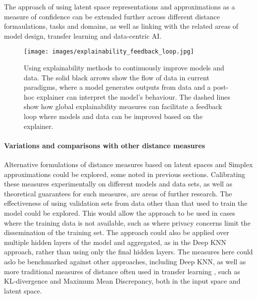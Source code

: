 \documentclass{article}
\begin{document}
The approach of using latent space representations and approximations as a measure of confidence can be extended further across different distance formaulations, tasks and domains, as well as linking with the related areas of model design, transfer learning and data-centric AI.

\begin{figure}[ht]
  \centering
  \texttt{[image: images/explainability\_feedback\_loop.jpg]}
  \caption{Using explainability methods to continuously improve models and data. The solid black arrows show the flow of data in current paradigms, where a model generates outputs from data and a post-hoc explainer can interpret the model's behaviour. The dashed lines show how global explainability measures can facilitate a feedback loop where models and data can be improved based on the explainer.}
  \label{explainability_loop}
\end{figure}


\paragraph{Variations and comparisons with other distance measures}
Alternative formulations of distance measures based on latent spaces and Simplex approximations could be explored, some noted in previous sections.
Calibrating these measures experimentally on different models and data sets, as well as theoretical guarantees for such measures, are areas of further research.
The effectiveness of using validation sets from data other than that used to train the model could be explored. This would allow the approach to be used in cases where the training data is not available, such as where privacy concerns limit the dissemination of the training set.
The approach could also be applied over multiple hidden layers of the model and aggregated, as in the Deep KNN approach, rather than using only the final hidden layers. The measures here could aslo be benchmarked against other approaches, including Deep KNN, as well as more traditional measures of distance often used in transfer learning \cite{zhuang_comprehensive_2021}, such as KL-divergence and Maximum Mean Discrepancy, both in the input space and latent space.
\end{document}
